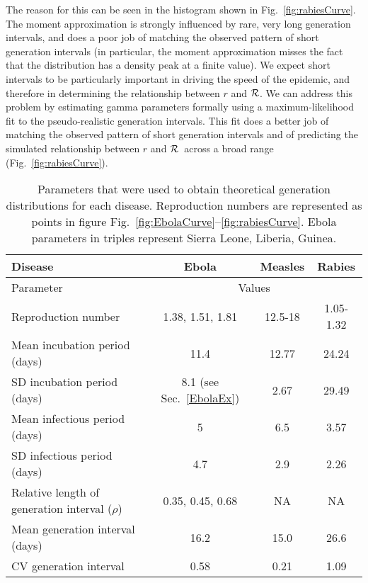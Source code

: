 \documentclass[12pt]{article}
\newcommand{\RR}{\ensuremath{{\cal R}}}
\newcommand{\fref}[1]{Fig.~\ref{fig:#1}}
\newcommand{\sref}[1]{Sec.~\ref{#1}}
\newcommand{\frange}[2]{Fig.~\ref{fig:#1}--\ref{fig:#2}}
\newcommand{\tlab}[1]{\label{tab:#1}}
\begin{document}
The reason for this can be seen in the histogram shown in \fref{rabiesCurve}. The moment approximation is strongly influenced by rare, very long generation intervals, and does a poor job of matching the observed pattern of short generation intervals (in particular, the moment approximation misses the fact that the distribution has a density peak at a finite value). We expect short intervals to be particularly important in driving the speed of the epidemic, and therefore in determining the relationship between $r$ and \RR. We can address this problem by estimating gamma parameters formally using a maximum-likelihood fit to the pseudo-realistic generation intervals. This fit does a better job of matching the observed pattern of short generation intervals and of predicting the simulated relationship between $r$ and \RR\ across a broad range (\fref{rabiesCurve}).


\begin{table}[h!]
\centering
\tiny
\begin{tabular}{l*{3}{c}}
\hline
Disease & Ebola & Measles & Rabies\\
\hline
Parameter & \multicolumn{3}{c}{Values}\\
\hline
Reproduction number & 1.38, 1.51, 1.81 \cite{AylwBarb14} & 12.5-18 \cite{anderson1982directly} & 1.05-1.32 \cite{HampDush09} \\
Mean incubation period (days) & 11.4 \cite{AylwBarb14} & 12.77 \cite{LessReic09}  & 24.24 \cite{HampDush09} \\
SD incubation period (days) & 8.1 (see \sref{EbolaEx}) & 2.67 \cite{LessReic09} & 29.49 \cite{HampDush09} \\
Mean infectious period (days) & 5 \cite{AylwBarb14} & 6.5 \cite{anderson1982directly} & 3.57 \cite{HampDush09} \\
SD infectious period (days) & 4.7 \cite{AylwBarb14} & 2.9 \cite{Lloy01} & 2.26 \cite{HampDush09}\\
\hline
Relative length of generation interval ($\rho$) & 0.35, 0.45, 0.68 \cite{AylwBarb14} & NA & NA \\
\hline
Mean generation interval (days) & 16.2 & 15.0 & 26.6 \\
CV generation interval & 0.58 & 0.21 & 1.09
\end{tabular}
\caption{Parameters that were used to obtain theoretical generation distributions for each disease. Reproduction numbers are represented as points in figure \frange{EbolaCurve}{rabiesCurve}. Ebola parameters in triples represent Sierra Leone, Liberia, Guinea.}
\tlab{parameters}
\end{table}
\end{document}
